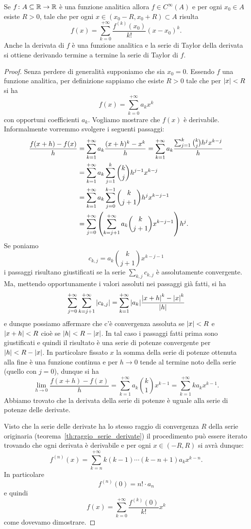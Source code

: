 \begin{theorem}
\label{th:48765}%
Se $f\colon A\subseteq {\mathbb R}\to{\mathbb R}$ è una funzione analitica allora
$f\in C^\infty(A)$ e per ogni $x_0\in A$ esiste $R>0$, tale che
per ogni $x \in (x_0-R, x_0+R)\subset A$ risulta
\begin{equation}\label{eq:2344494}
  f(x) = \sum_{k=0}^{+\infty} \frac{f^{(k)}(x_0)}{k!}(x-x_0)^k.
\end{equation}
Anche la derivata di $f$ è una funzione analitica e la serie
di Taylor della derivata si ottiene derivando termine a termine
la serie di Taylor di $f$.
\end{theorem}
%
\begin{proof}
Senza perdere di generalità supponiamo che sia $x_0=0$. Essendo $f$
una funzione analitica, per definizione sappiamo che esiste $R>0$
tale che per ${\left|x\right|}<R$ si ha
\[
f(x) = \sum_{k=0}^{+\infty} a_k x^k
\]
con opportuni coefficienti $a_k$. Vogliamo mostrare che $f(x)$ è derivabile.
Informalmente vorremmo svolgere i seguenti passaggi:
\begin{align*}
\frac{f(x+h) - f(x)}{h}
&= \sum_{k=1}^{+\infty} a_k \frac{(x+h)^k-x^k}{h}
= \sum_{k=1}^{+\infty} a_k \frac{\sum_{j=1}^k {k\choose j} h^j x^{k-j}}{h} \\
&= \sum_{k=1}^{+\infty} a_k \sum_{j=1}^k {k\choose j} h^{j-1} x^{k-j} \\
&= \sum_{k=1}^{+\infty} a_k \sum_{j=0}^{k-1} {k\choose j+1} h^j x^{k-j-1} \\
&= \sum_{j=0}^{+\infty} {\left( \sum_{k=j+1}^{+\infty} a_k {k\choose j+1} x^{k-j-1} \right)} h^j.
\end{align*}
Se poniamo
\[
  c_{k,j} = a_k {k\choose j+1} x^{k-j-1}
\]
i passaggi risultano giustificati se la serie $\sum_{k,j} c_{k,j}$
è assolutamente convergente. Ma, mettendo opportunamente
i valori assoluti nei passaggi già fatti, si ha
\[
  \sum_{j=0}^{+\infty} \sum_{k=j+1}^{+\infty} {\left|c_{k,j}\right|}
  =  \sum_{k=1}^{+\infty} {\left|a_k\right|} \frac{{\left|x+h\right|}^k-{\left|x\right|}^k}{{\left|h\right|}}
\]
e dunque possiamo affermare che c'è convergenza assoluta
se ${\left|x\right|}<R$ e ${\left|x+h\right|}<R$ cioè se ${\left|h\right|}< R-{\left|x\right|}$. In tal caso
i passaggi fatti prima sono giustificati e quindi il risultato
è una serie di potenze convergente per ${\left|h\right|}<R-{\left|x\right|}$. In particolare
fissato $x$
la somma della serie di potenze ottenuta alla fine è una funzione continua
e per $h\to 0$
tende al termine noto della serie (quello con $j=0$), dunque si ha
\[
  \lim_{h\to 0} \frac{f(x+h)-f(x)}{h}
  = \sum_{k=1}^{+\infty} a_k {k \choose 1} x^{k-1}
  = \sum_{k=1}^{+\infty} k a_k x^{k-1}.
\]
Abbiamo trovato che la derivata della serie di potenze è uguale
alla serie di potenze delle derivate.

Visto che la serie delle derivate ha lo stesso raggio di convergenza $R$
della serie originaria (teorema~\ref{th:raggio_serie_derivate})
il procedimento può essere iterato trovando che ogni derivata è derivabile
e per ogni $x\in (-R,R)$ si avrà dunque:
\[
  f^{(n)}(x) = \sum_{k=n}^{+\infty}k (k-1) \cdots (k-n+1) a_k x^{k-n}.
\]
In particolare
\[
  f^{(n)}(0) = n! \cdot a_n
\]
e quindi
\[
  f(x) = \sum_{k=0}^{+\infty} \frac{f^{(k)}(0)}{k!} x^k
\]
come dovevamo dimostrare.
\end{proof}

